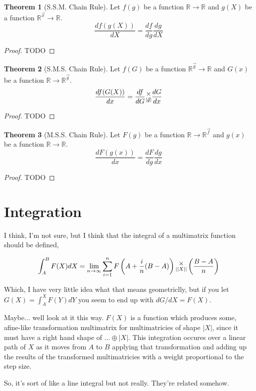 \documentclass[12pt]{article}
\theoremstyle{definition}
\newtheorem{theorem}{Theorem}[section]
\theoremstyle{case}
\theoremstyle{ppart}
\newcommand{\mmult}[1]{\text{\raisebox{1ex}{$\underset{#1}{\times}$}}}
\begin{document}
\begin{theorem}[S.S.M. Chain Rule]
\label{ssm_chain_rule}
Let $f(g)$ be a function $\mathbb{R} \rightarrow \mathbb{R}$
and $g(X)$ be a function $\mathbb{R}^{\vec{x}} \rightarrow \mathbb{R}$.
\[
\frac{df(g(X))}{dX} = \frac{df}{dg} \frac{dg}{dX}
\]
\end{theorem}
\begin{proof}
TODO
\end{proof}

\begin{theorem}[S.M.S. Chain Rule]
\label{sms_chain_rule}
Let $f(G)$ be a function $\mathbb{R}^{\vec{g}} \rightarrow \mathbb{R}$
and $G(x)$ be a function $\mathbb{R} \rightarrow \mathbb{R}^{\vec{g}}$.
\[
\frac{df(G(X))}{dx} = \frac{df}{dG} \mmult{|\vec{g}|} \frac{dG}{dx}
\]
\end{theorem}
\begin{proof}
TODO
\end{proof}

\begin{theorem}[M.S.S. Chain Rule]
\label{mss_chain_rule}
Let $F(g)$ be a function $\mathbb{R} \rightarrow \mathbb{R}^{\vec{f}}$
and $g(x)$ be a function $\mathbb{R} \rightarrow \mathbb{R}$.
\[
\frac{dF(g(x))}{dx} = \frac{dF}{dg} \frac{dg}{dx}
\]
\end{theorem}
\begin{proof}
TODO
\end{proof}

\section{Integration}

I think, I'm not sure, but I think that the integral of a multimatrix function should
be defined,

\[
 \int_A^B F(X) dX = \lim_{n \to \infty}
 \sum_{i=1}^n
  F\left(A+\frac{i}{n}(B-A)\right)
  \mmult{||X||}
  \left(\frac{B-A}{n}\right)
\]

Which, I have very little idea what that means geometriclly, but
if you let $G(X) = \int_A^X F(Y) dY$ you seem to end up with $dG/dX = F(X)$.

Maybe... well look at it this way. $F(X)$ is a function which produces some,
afine-like transformation multimatrix for multimatricies of shape $|X|$,
since it must have a right hand shape of $\ldots \oplus |X|$. This integration
occures over a linear path of $X$ as it moves from $A$ to $B$ applying that
transformation and adding up the results of the transformed multimatricies with
a weight proportional to the step size.

So, it's sort of like a line integral but not really. They're related somehow.
\end{document}
